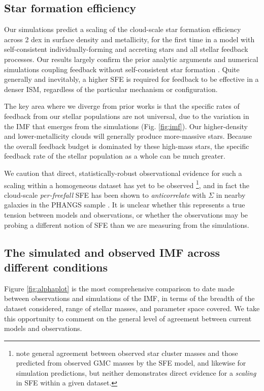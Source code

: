 \documentclass[apjl,twocolumn]{openjournal}
\begin{document}
\subsection{Star formation efficiency}
Our simulations predict a scaling of the cloud-scale star formation efficiency across 2 dex in surface density and metallicity, for the first time in a model with self-consistent individually-forming and accreting stars and all stellar feedback processes. Our results largely confirm the prior analytic arguments \citep{fall:2010.sf.eff.vs.surfacedensity,murray:2010.sfe.mw.gmc} and numerical simulations coupling feedback without self-consistent star formation \citep{geen:2017, kim:2018.uv.feedback,grudic:2016.sfe}. Quite generally and inevitably, a higher SFE is required for feedback to be effective in a denser ISM, regardless of the particular mechanism or configuration. 

The key area where we diverge from prior works is that the specific rates of feedback from our stellar populations are not universal, due to the variation in the IMF that emerges from the simulations (Fig. \ref{fig:imf}). Our higher-density and lower-metallicity clouds will generally produce more-massive stars. Because the overall feedback budget is dominated by these high-mass stars, the specific feedback rate of the stellar population as a whole can be much greater.

We caution that direct, statistically-robust observational evidence for such a scaling within a homogeneous dataset has yet to be observed \footnote{\citet{mok:2020} note general agreement between observed star cluster masses and those predicted from observed GMC masses by the \citet{fall:2010.sf.eff.vs.surfacedensity} SFE model, and likewise \citet{grudic_2020_cluster_formation} for simulation predictions, but neither demonstrates direct evidence for a {\it scaling} in SFE within a given dataset.}, and in fact the cloud-scale {\it per-freefall} SFE has been shown to {\it anticorrelate} with $\Sigma$ in nearby galaxies in the PHANGS sample \citep{leroy:2025.phangs.sfe}. It is unclear whether this represents a true tension between models and observations, or whether the observations may be probing a different notion of SFE than we are measuring from the simulations.

\subsection{The simulated and observed IMF across different conditions}
\label{sec:imf.comparison}
Figure \ref{fig:alphaplot} is the most comprehensive comparison to date made between observations and simulations of the IMF, in terms of the breadth of the dataset considered, range of stellar masses, and parameter space covered. We take this opportunity to comment on the general level of agreement between current models and observations.
\end{document}
